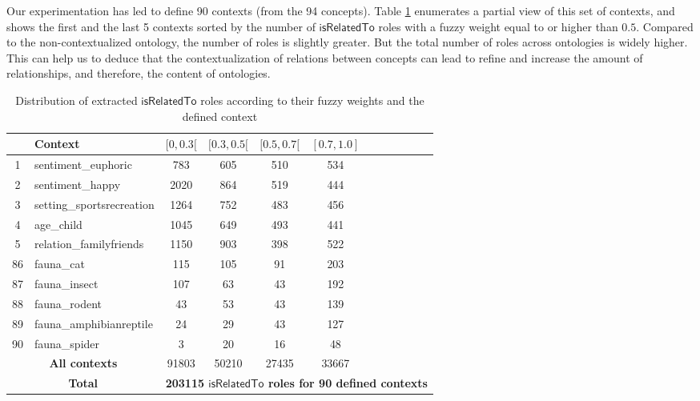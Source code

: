 		Our experimentation has led to define 90 contexts (from the 94 concepts). 
		Table \ref{table:context-based_ontology} enumerates a partial view of this set of contexts, 
		and shows the first and the last 5 contexts sorted 
		by the number of $\mathsf{isRelatedTo}$ roles with a fuzzy weight equal to or higher than $0.5$.
		Compared to the non-contextualized ontology, the number of roles is slightly greater. But the total number 
		of roles across ontologies is widely higher. This can help us to deduce that the 
		contextualization of relations between concepts can lead to refine and increase 
		the amount of relationships, and therefore, the content of ontologies.
		\begin{table}
		\centering	
		\caption{Distribution of extracted $\mathsf{isRelatedTo}$ roles according to their fuzzy weights and the defined context}
		\label{table:context-based_ontology}
		\begin{tabular}{c l c c c c c c c c c c} \hline
		~&\textbf{Context}& \small{$[0, 0.3[$} & \small{$[0.3, 0.5[$} & \small{$[0.5, 0.7[$} & \small{$[0.7, 1.0]$} \\ 
		\hline
			\scriptsize{1}&\small{sentiment\_euphoric}	&783	&605	&510	&534\\
			\scriptsize{2}&\small{sentiment\_happy}		&2020	&864	&519	&444\\
			\scriptsize{3}&\small{setting\_sportsrecreation}&1264	&752	&483	&456\\ 
			\scriptsize{4}&\small{age\_child}		&1045	&649	&493	&441\\ 
			\scriptsize{5}&\small{relation\_familyfriends}	&1150	&903	&398	&522\\ \hline
			\scriptsize{86}&\small{fauna\_cat}		&115	&105	&91	&203\\ 
			\scriptsize{87}&\small{fauna\_insect}		&107	&63	&43	&192\\
			\scriptsize{88}&\small{fauna\_rodent}		&43	&53	&43	&139\\ 
			\scriptsize{89}&\small{fauna\_amphibianreptile}	&24	&29	&43	&127\\ 
			\scriptsize{90}&\small{fauna\_spider}		&3	&20	&16	&48\\ \hline 
			\multicolumn{2}{c}{\textbf{All contexts}}	&91803 	&50210	&27435	&33667\\
			\hline
			\multicolumn{2}{c}{\textbf{Total}}& \multicolumn{10}{c}{\textbf{203115 $\mathsf{isRelatedTo}$ 
								roles for 90 defined contexts}}\\ \hline
		\end{tabular}
		\end{table}
		

